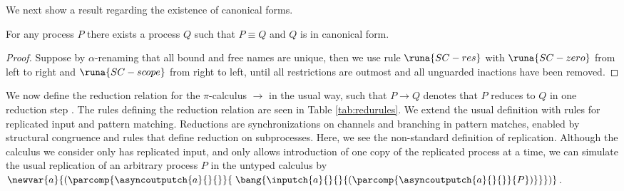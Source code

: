 %
We next show a result regarding the existence of canonical forms.
\begin{lemma}
For any process $P$ there exists a process $Q$ such that $P \equiv Q$ and $Q$ is in canonical form.
\begin{proof}
Suppose by $\alpha$-renaming that all bound and free names are unique, then we use rule $\runa{SC-res}$ with $\runa{SC-zero}$ from left to right and $\runa{SC-scope}$ from right to left, until all restrictions are outmost and all unguarded inactions have been removed.
\end{proof}
\end{lemma}\label{lemma:cannform}

We now define the reduction relation for the $\pi$-calculus $\longrightarrow$ in the usual way, such that $P \longrightarrow Q$ denotes that $P$ reduces to $Q$ in one reduction step \cite{Milner1993}. The rules defining the reduction relation are seen in Table \ref{tab:redurules}. We extend the usual definition with rules for replicated input and pattern matching. Reductions are synchronizations on channels and branching in pattern matches, enabled by structural congruence and rules that define reduction on subprocesses. Here, we see the non-standard definition of replication. Although the calculus we consider only has replicated input, and only allows introduction of one copy of the replicated process at a time, we can simulate the usual replication of an arbitrary process $P$ in the untyped calculus by
$\newvar{a}{\left(\parcomp{\asyncoutputch{a}{}{}}{\;\bang{\inputch{a}{}{}{\left(\parcomp{\asyncoutputch{a}{}{}}{P}\right)}}}\right)}$.\\
%
